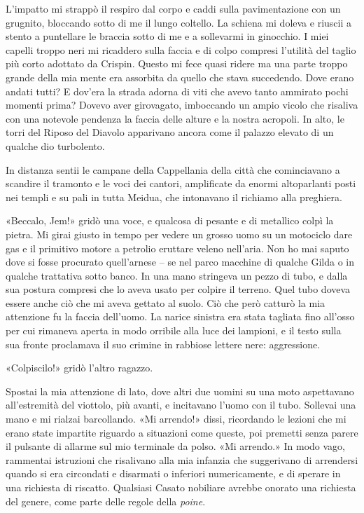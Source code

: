 L'impatto mi strappò il respiro dal corpo e caddi sulla pavimentazione
con un grugnito, bloccando sotto di me il lungo coltello. La schiena mi
doleva e riuscii a stento a puntellare le braccia sotto di me e a
sollevarmi in ginocchio. I miei capelli troppo neri mi ricaddero sulla
faccia e di colpo compresi l'utilità del taglio più corto adottato da
Crispin. Questo mi fece quasi ridere ma una parte troppo grande della
mia mente era assorbita da quello che stava succedendo. Dove erano
andati tutti? E dov'era la strada adorna di viti che avevo tanto
ammirato pochi momenti prima? Dovevo aver girovagato, imboccando un
ampio vicolo che risaliva con una notevole pendenza la faccia delle
alture e la nostra acropoli. In alto, le torri del Riposo del Diavolo
apparivano ancora come il palazzo elevato di un qualche dio turbolento.

In distanza sentii le campane della Cappellania della città che
cominciavano a scandire il tramonto e le voci dei cantori, amplificate
da enormi altoparlanti posti nei templi e su pali in tutta Meidua, che
intonavano il richiamo alla preghiera.

«Beccalo, Jem!» gridò una voce, e qualcosa di pesante e di metallico
colpì la pietra. Mi girai giusto in tempo per vedere un grosso uomo su
un motociclo dare gas e il primitivo motore a petrolio eruttare veleno
nell'aria. Non ho mai saputo dove si fosse procurato quell'arnese -- se
nel parco macchine di qualche Gilda o in qualche trattativa sotto banco.
In una mano stringeva un pezzo di tubo, e dalla sua postura compresi che
lo aveva usato per colpire il terreno. Quel tubo doveva essere anche ciò
che mi aveva gettato al suolo. Ciò che però catturò la mia attenzione fu
la faccia dell'uomo. La narice sinistra era stata tagliata fino all'osso
per cui rimaneva aperta in modo orribile alla luce dei lampioni, e il
testo sulla sua fronte proclamava il suo crimine in rabbiose lettere
nere: \foreignlanguage{italian}{aggressione}.

«Colpiscilo!» gridò l'altro ragazzo.

Spostai la mia attenzione di lato, dove altri due uomini su una moto
aspettavano all'estremità del viottolo, più avanti, e incitavano l'uomo
con il tubo. Sollevai una mano e mi rialzai barcollando. «Mi arrendo!»
dissi, ricordando le lezioni che mi erano state impartite riguardo a
situazioni come queste, poi premetti senza parere il pulsante di allarme
sul mio terminale da polso. «Mi arrendo.» In modo vago, rammentai
istruzioni che risalivano alla mia infanzia che suggerivano di
arrendersi quando si era circondati e disarmati o inferiori
numericamente, e di sperare in una richiesta di riscatto. Qualsiasi
Casato nobiliare avrebbe onorato una richiesta del genere, come parte
delle regole della \emph{poine}.

